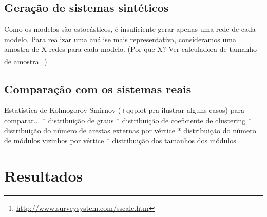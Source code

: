 \documentclass{acm_proc_article-sp}
\begin{document}
\subsection{Geração de sistemas sintéticos}

Como os modelos são estocásticos, é insuficiente gerar apenas uma rede de cada modelo. Para realizar uma análise mais representativa, consideramos uma amostra de X redes para cada modelo.
(Por que X? Ver calculadora de tamanho de amostra \footnote{\url{http://www.surveysystem.com/sscalc.htm}})

\subsection{Comparação com os sistemas reais}

Estatística de Kolmogorov-Smirnov (+qqplot pra ilustrar alguns casos) para comparar...
* distribuição de graus
* distribuição de coeficiente de clustering
* distribuição do número de arestas externas por vértice
* distribuição do número de módulos vizinhos por vértice
* distribuição dos tamanhos dos módulos





\section{Resultados} \label{sec:resultados}
\end{document}
